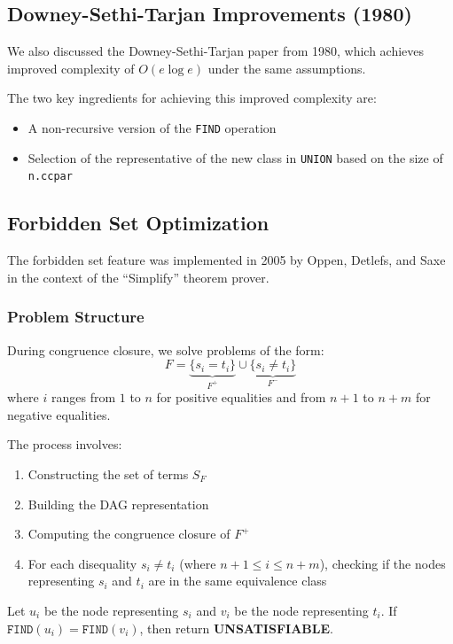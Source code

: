 \documentclass[11pt,a4paper]{article}
\theoremstyle{definition}
\theoremstyle{plain}
\theoremstyle{remark}
\begin{document}
\subsection{Downey-Sethi-Tarjan Improvements (1980)}

We also discussed the Downey-Sethi-Tarjan paper from 1980, which achieves improved complexity of $O(e \log e)$ under the same assumptions.

The two key ingredients for achieving this improved complexity are:
\begin{itemize}
    \item A non-recursive version of the \texttt{FIND} operation
    \item Selection of the representative of the new class in \texttt{UNION} based on the size of \texttt{n.ccpar}
\end{itemize}

\subsection{Forbidden Set Optimization}

The forbidden set feature was implemented in 2005 by Oppen, Detlefs, and Saxe in the context of the ``Simplify'' theorem prover.

\subsubsection{Problem Structure}

During congruence closure, we solve problems of the form:
\[
F = \underbrace{\{s_i = t_i\}}_{F^+} \cup \underbrace{\{s_i \neq t_i\}}_{F^-}
\]
where $i$ ranges from $1$ to $n$ for positive equalities and from $n+1$ to $n+m$ for negative equalities.

The process involves:
\begin{enumerate}
    \item Constructing the set of terms $S_F$
    \item Building the DAG representation
    \item Computing the congruence closure of $F^+$
    \item For each disequality $s_i \neq t_i$ (where $n+1 \leq i \leq n+m$), checking if the nodes representing $s_i$ and $t_i$ are in the same equivalence class
\end{enumerate}

Let $u_i$ be the node representing $s_i$ and $v_i$ be the node representing $t_i$. If $\texttt{FIND}(u_i) = \texttt{FIND}(v_i)$, then return \textbf{UNSATISFIABLE}.
\end{document}
